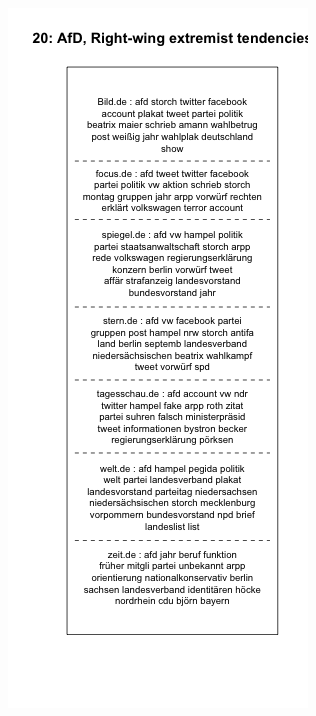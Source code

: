 \documentclass[12pt,a4paper,notitlepage]{article}
\begin{document}
\begin{figure}[H]
	\begin{center}
		\begin{subfigure}[normla]{0.49\textwidth}
			\includegraphics[width=\textwidth]{../figs/plotquote20.png}

\end{subfigure}
\end{center}
\end{figure}
\end{document}
